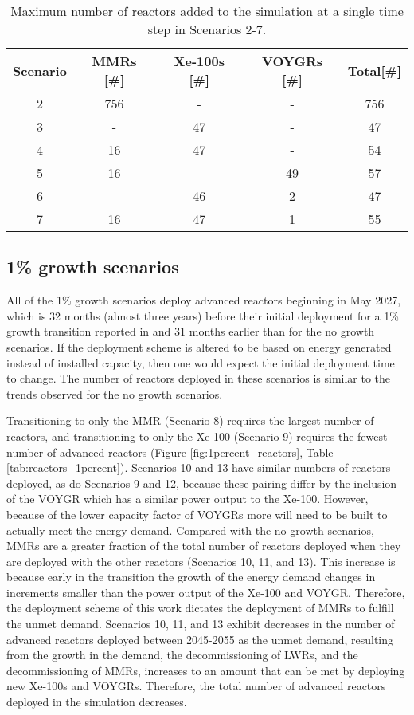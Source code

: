 \begin{table}
    \centering 
    \caption{Maximum number of reactors added to the simulation at a 
    single time step in Scenarios 2-7.}
    \label{tab:reactors_added_nogrowth}
    \begin{tabular}{c c c c c}
        \hline
        Scenario & \glspl{MMR} [\#]& Xe-100s [\#]& VOYGRs [\#]
        & Total[\#]\\\hline
        2 & 756 & - & - & 756\\
        3 & - & 47 & - & 47\\
        4 & 16 & 47 & - & 54\\
        5 & 16 & - & 49 & 57\\
        6 & - & 46 & 2 & 47\\
        7 & 16 & 47 & 1 & 55\\
        \hline
    \end{tabular}
\end{table}

\subsection{1\% growth scenarios} \label{sec:1percent_reactors}
All of the 1\% growth scenarios deploy advanced reactors beginning 
in May 2027, which is 32 months (almost three years) before their initial 
deployment for a 1\% growth 
transition reported in \cite{bachmann_enrichment_2021} and 31 months 
earlier than for the no growth scenarios. If the deployment scheme is 
altered to be based on energy generated instead of installed capacity, 
then one would expect the initial deployment time to change. The number 
of reactors deployed in these scenarios is similar to 
the trends observed for the no 
growth scenarios. 

Transitioning to only the 
\gls{MMR} (Scenario 8) requires the largest number of reactors, and 
transitioning to only the Xe-100 (Scenario 9) requires the fewest 
number of advanced reactors (Figure \ref{fig:1percent_reactors}, Table 
\ref{tab:reactors_1percent}). Scenarios 10 and 13 have similar numbers of 
reactors deployed, as do Scenarios 9 and 12, because these pairing differ 
by the inclusion of the VOYGR which has a similar power output to the 
Xe-100. However, because of the lower capacity factor of VOYGRs more will 
need to be built to actually meet the energy demand. 
Compared with the no growth scenarios, \glspl{MMR} are a greater 
fraction of the total number of reactors deployed when they are deployed 
with the other reactors (Scenarios 10, 11, and 13). This increase is 
because early in the transition the growth of the energy demand 
changes in increments smaller than the power output of the Xe-100 and 
VOYGR. Therefore, the deployment scheme of this work dictates the 
deployment of \glspl{MMR}
to fulfill the unmet demand. Scenarios 10, 11, and 13 exhibit decreases in 
the number of advanced reactors deployed between 2045-2055 as the unmet 
demand, resulting from the growth in the demand, the decommissioning of 
\glspl{LWR}, and the decommissioning of \glspl{MMR}, increases  
to an amount that can be met by deploying new Xe-100s and VOYGRs. Therefore, 
the total number of advanced reactors deployed in the simulation decreases.

